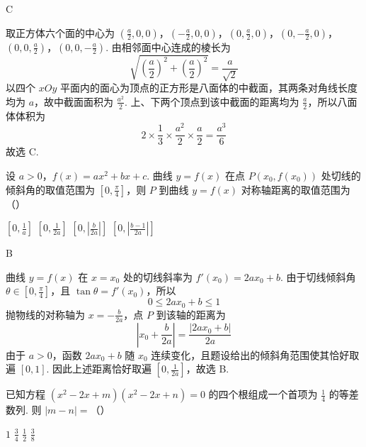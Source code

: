 \begin{answer}
C
\end{answer}

\begin{solution}
取正方体六个面的中心为 \(\left(\frac a2,0,0\right)\)，\(\left(-\frac a2,0,0\right)\)，\(\left(0,\frac a2,0\right)\)，\(\left(0,-\frac a2,0\right)\)，\(\left(0,0,\frac a2\right)\)，\(\left(0,0,-\frac a2\right)\). 由相邻面中心连成的棱长为
\[
\sqrt{\left(\frac a2\right)^2+\left(\frac a2\right)^2}=\frac{a}{\sqrt2}
\]
以四个 \(xOy\) 平面内的面心为顶点的正方形是八面体的中截面，其两条对角线长度均为 \(a\)，故中截面面积为 \(\frac{a^{2}}{2}\). 上、下两个顶点到该中截面的距离均为 \(\frac a2\)，所以八面体体积为
\[
2\times\frac13\times\frac{a^{2}}2\times\frac a2=\frac{a^{3}}6
\]
故选 C.
\end{solution}

\begin{problem}
设 \(a > 0\)，\(f(x) = ax^2 + bx + c\). 曲线 \(y = f(x)\) 在点 \(P(x_0, f(x_0))\) 处切线的倾斜角的取值范围为 \(\left[0, \frac{\pi}{4}\right]\)，则 \(P\) 到曲线 \(y = f(x)\) 对称轴距离的取值范围为（\quad）

\choices
    {\(\left[0, \frac{1}{a}\right]\)}
    {\(\left[0, \frac{1}{2a}\right]\)}
    {\(\left[0, \left|\frac{b}{2a}\right|\right]\)}
    {\(\left[0, \left|\frac{b - 1}{2a}\right|\right]\)}
\end{problem}

\begin{answer}
B
\end{answer}

\begin{solution}
曲线 \(y=f(x)\) 在 \(x=x_{0}\) 处的切线斜率为 \(f'(x_{0})=2ax_{0}+b\). 由于切线倾斜角 \(\theta\in\left[0,\frac{\pi}{4}\right]\)，且 \(\tan\theta=f'(x_{0})\)，所以
\[
0\leqslant2ax_{0}+b\leqslant1
\]
抛物线的对称轴为 \(x=-\frac{b}{2a}\)，点 \(P\) 到该轴的距离为
\[
\left|x_{0}+\frac{b}{2a}\right|=\frac{|2ax_{0}+b|}{2a}
\]
由于 \(a>0\)，函数 \(2ax_{0}+b\) 随 \(x_{0}\) 连续变化，且题设给出的倾斜角范围使其恰好取遍 \([0,1]\). 因此上述距离恰好取遍 \(\left[0,\frac{1}{2a}\right]\)，故选 B.
\end{solution}

\begin{problem}
已知方程 \((x^{2} - 2x + m)(x^{2} - 2x + n) = 0\) 的四个根组成一个首项为 \(\frac{1}{4}\) 的等差数列. 则 \(|m - n| =\)（\quad）

\choices
    {\(1\)}
    {\(\frac{3}{4}\)}
    {\(\frac{1}{2}\)}
    {\(\frac{3}{8}\)}
\end{problem}

